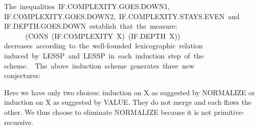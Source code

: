 \documentclass[11pt]{book}
\newenvironment{pubasis}{\begin{flushleft}\ttfamily\small}{\normalsize\rmfamily\end{flushleft}}
\begin{document}
\begin{pubasis}
The~inequalities~IF.COM\-PLEX\-I\-TY.GOES.DOWN1,\\
IF.COM\-PLEX\-I\-TY.GOES.DOWN2,~IF.COM\-PLEX\-I\-TY.STAYS.EVEN~and\\
IF.DEPTH.GOES.DOWN~establish~that~the~measure:\\
~~~~~~(CONS~(IF.COM\-PLEX\-I\-TY~X)~(IF.DEPTH~X))\\
decreases~according~to~the~well-founded~lexicographic~relation\\
induced~by~LESSP~and~LESSP~in~each~induction~step~of~the\\
scheme.~~The~above~induction~scheme~generates~three~new\\
conjectures:\\
\end{pubasis}
Here we  have only two choices: induction on X as suggested by
NORMALIZE or induction on X 
as suggested by VALUE.  They do not merge and each flaws
the other.  We thus choose to eliminate
NORMALIZE because it is not primitive-recursive.
\end{document}
